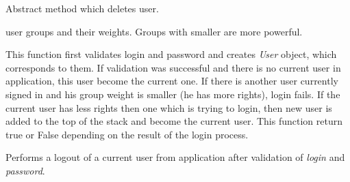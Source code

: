 \documentclass[letterpaper,10pt,english]{sphinxmanual}
\begin{document}
\begin{fulllineitems}
\begin{fulllineitems}
\end{fulllineitems}


\begin{fulllineitems}
\label{sysmod:pyfrid.modules.system.auth.core.auth.BaseAuthModule.del_user}
Abstract method which deletes user.

\end{fulllineitems}


\begin{fulllineitems}
\label{sysmod:pyfrid.modules.system.auth.core.auth.BaseAuthModule.groups}
user groups and their weights. Groups with smaller are more powerful.

\end{fulllineitems}


\begin{fulllineitems}
\label{sysmod:pyfrid.modules.system.auth.core.auth.BaseAuthModule.login}
This function first validates login and password and creates \emph{User} object, which corresponds to them.
If validation was successful and there is no current user in application, this user become the current one.
If there is another user currently signed in and his group weight is smaller (he has more rights), login fails.
If the current user has less rights then one which is trying to login, then new user is added to the top of the
stack and become the current user. This function return true or False depending on the result of the login process.

\end{fulllineitems}


\begin{fulllineitems}
\label{sysmod:pyfrid.modules.system.auth.core.auth.BaseAuthModule.logout}
Performs a logout of a current user from application after validation of \emph{login} and \emph{password}.


\end{fulllineitems}
\end{fulllineitems}
\end{document}
